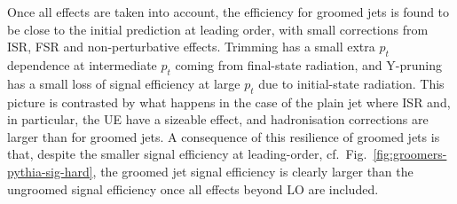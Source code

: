 Once all effects are taken into account, the efficiency for groomed
jets is found to be close to the initial prediction at leading order,
with small corrections from ISR, FSR and non-perturbative
effects. Trimming has a small extra $p_t$ dependence at intermediate
$p_t$ coming from final-state radiation, and Y-pruning has a small
loss of signal efficiency at large $p_t$ due to initial-state
radiation.
%
This picture is contrasted by what happens in the case of the plain
jet where ISR and, in particular, the UE have a sizeable
effect, and hadronisation corrections are larger than for groomed
jets.
%
A consequence of this resilience of groomed jets is that, despite the
smaller signal efficiency at leading-order,
cf.~Fig.~\ref{fig:groomers-pythia-sig-hard}, the groomed jet signal
efficiency is clearly larger than the ungroomed signal efficiency once
all effects beyond LO are included.



